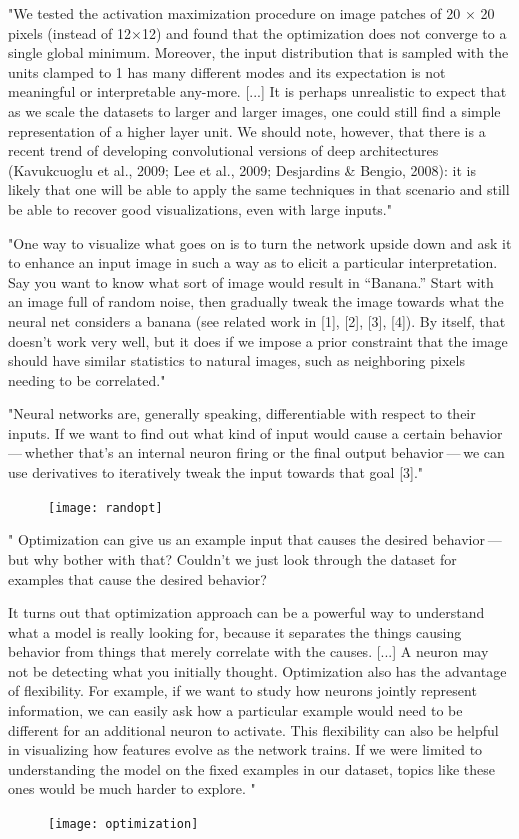 		"We tested the activation maximization procedure on image patches of 20 × 20 pixels (instead of 12×12) and found that the optimization does not converge to a single global minimum. Moreover, the input distribution that is sampled with the units clamped to 1 has many different modes and its expectation is not meaningful or interpretable any-more. [...] 
		It is perhaps unrealistic to expect that as we scale the datasets to larger and larger images, one could still find a simple representation of a higher layer unit. We should note, however, that there is a recent trend of developing convolutional versions of deep architectures (Kavukcuoglu et al., 2009; Lee et al., 2009; Desjardins \& Bengio, 2008): it is likely that one will be able to apply the same techniques in that scenario and still be able to recover good visualizations, even with large inputs." \cite{Erhan2009}
		
		"One way to visualize what goes on is to turn the network upside down and ask it to enhance an input image in such a way as to elicit a particular interpretation. Say you want to know what sort of image would result in “Banana.” Start with an image full of random noise, then gradually tweak the image towards what the neural net considers a banana (see related work in [1], [2], [3], [4]). By itself, that doesn’t work very well, but it does if we impose a prior constraint that the image should have similar statistics to natural images, such as neighboring pixels needing to be correlated." \cite{Mordvintsev2015}
		
		"Neural networks are, generally speaking, differentiable with respect to their inputs. If we want to find out what kind of input would cause a certain behavior --- whether that's an internal neuron firing or the final output behavior --- we can use derivatives to iteratively tweak the input towards that goal [3]." \cite{Olah2017}
		\begin{figure}[h]
			\centering
			\texttt{[image: randopt]}
		\end{figure}
		
		" Optimization can give us an example input that causes the desired behavior --- but why bother with that? Couldn't we just look through the dataset for examples that cause the desired behavior?
		
		It turns out that optimization approach can be a powerful way to understand what a model is really looking for, because it separates the things causing behavior from things that merely correlate with the causes. [...] A neuron may not be detecting what you initially thought. Optimization also has the advantage of ﬂexibility. For example, if we want to study how neurons jointly represent information, we can easily ask how a particular example would need to be different for an additional neuron to activate. This ﬂexibility can also be helpful in visualizing how features evolve as the network trains. If we were limited to understanding the model on the ﬁxed examples in our dataset, topics like these ones would be much harder to explore. " \cite{Olah2017}
		\begin{figure}[h]
			\centering
			\texttt{[image: optimization]}
		\end{figure}
	

